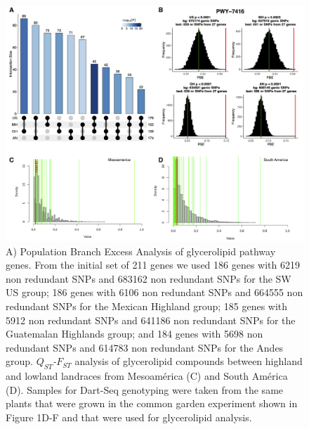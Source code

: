 \documentclass[9pt,twocolumn,twoside]{BioRxiv}
\begin{document}
\begin{figure}[t]
\begin{center}
\includegraphics[width=0.8\paperwidth]{Sup_Figures/Sup_Fig_1.png}
\caption{A) Population Branch Excess Analysis of glycerolipid pathway genes.
From the initial set of 211 genes we used 186 genes with 6219 non redundant SNPs and 683162 non redundant SNPs for the SW US group; 186 genes with 6106 non redundant SNPs and 664555 non redundant SNPs for the Mexican Highland group;
185 genes with 5912 non redundant SNPs and 641186 non redundant SNPs for the Guatemalan Highlands group; and 184 genes with 5698 non redundant SNPs and 614783 non redundant SNPs for the Andes group.    
\textit{$Q_{ST}$-$F_{ST}$} analysis of glycerolipid compounds between highland and lowland landraces from Mesoamérica (C) and South América (D).
Samples for Dart-Seq genotyping were taken from the same plants that were grown in the common garden experiment shown in Figure 1D-F and that were used for glycerolipid analysis. 
}
\label{SupFig1}
\end{center}
\end{figure} 
\end{document}

